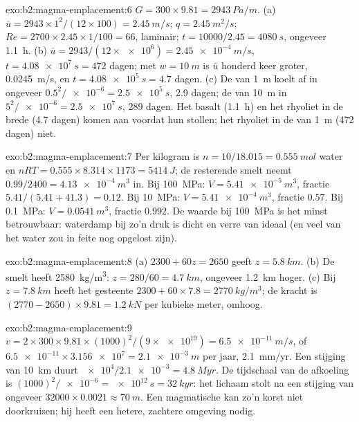 \begin{solution}{exo:b2:magma-emplacement:6}
$G = 300\times9.81 = \qty{2943}{Pa/m}$. (a) $\bar u = 2943\times1^2/(12\times100) =
\qty{2.45}{m/s}$; $q = \qty{2.45}{m^2/s}$; $Re = 2700\times2.45\times1/100 = 66$, laminair;
$t = 10000/2.45 = \qty{4080}{s}$, ongeveer \qty{1.1}{h}. (b) $\bar u =
2943/(12\times\num{e6}) = \qty{2.45e-4}{m/s}$, $t = \qty{4.08e7}{s} = 472$ dagen; met
$w = \qty{10}{m}$ is $\bar u$ honderd keer groter, \qty{0.0245}{m/s}, en $t =
\qty{4.08e5}{s} = 4.7$ dagen. (c) De  van \qty{1}{m} koelt af in ongeveer
$0.5^2/\num{e-6} = \qty{2.5e5}{s}$, 2.9 dagen; de  van \qty{10}{m} in $5^2/\num{e-6} =
\qty{2.5e7}{s}$, 289 dagen. Het basalt (\qty{1.1}{h}) en het rhyoliet in de brede
 (4.7 dagen) komen aan voordat hun  stollen; het rhyoliet in de
 van \qty{1}{m} (472 dagen) niet.
\end{solution}

\begin{solution}{exo:b2:magma-emplacement:7}
Per kilogram  is $n = 10/18.015 = \qty{0.555}{mol}$ water en $nRT =
0.555\times8.314\times1173 = \qty{5414}{J}$; de resterende smelt neemt $0.99/2400 =
\qty{4.13e-4}{m^3}$ in. Bij \qty{100}{MPa}: $V = \qty{5.41e-5}{m^3}$, fractie
$5.41/(5.41 + 41.3) = 0.12$. Bij \qty{10}{MPa}: $V = \qty{5.41e-4}{m^3}$, fractie
$0.57$. Bij \qty{0.1}{MPa}: $V = \qty{0.0541}{m^3}$, fractie $0.992$. De waarde bij
\qty{100}{MPa} is het minst betrouwbaar: waterdamp bij zo'n druk is dicht en
verre van ideaal (en veel van het water zou in feite nog opgelost zijn).
\end{solution}

\begin{solution}{exo:b2:magma-emplacement:8}
(a) $2300 + 60z = 2650$ geeft $z = \qty{5.8}{km}$. (b) De smelt heeft
\qty{2580}{kg/m^3}: $z = 280/60 = \qty{4.7}{km}$, ongeveer \qty{1.2}{km} hoger. (c)
Bij $z = \qty{7.8}{km}$ heeft het gesteente $2300 + 60\times7.8 = \qty{2770}{kg/m^3}$; de
kracht is $(2770 - 2650)\times9.81 = \qty{1.2}{kN}$ per kubieke meter, omhoog.
\end{solution}

\begin{solution}{exo:b2:magma-emplacement:9}
$v = 2\times300\times9.81\times(1000)^2/(9\times\num{e19}) = \qty{6.5e-11}{m/s}$, of
$\num{6.5e-11}\times\num{3.156e7} = \qty{2.1e-3}{m}$ per jaar, \qty{2.1}{mm/yr}. Een stijging van
\qty{10}{km} duurt $\num{e4}/\num{2.1e-3} = \qty{4.8}{Myr}$. De tijdschaal van de afkoeling
is $(1000)^2/\num{e-6} = \qty{e12}{s} = \qty{32}{kyr}$: het lichaam stolt na
een stijging van ongeveer $32000\times0.0021 \approx \qty{70}{m}$. Een magmatische  kan
zo'n korst niet doorkruisen; hij heeft een hetere, zachtere omgeving nodig.
\end{solution}

